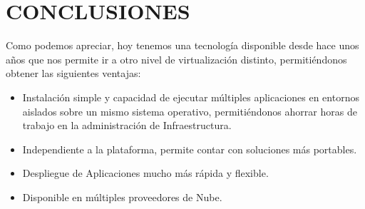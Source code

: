\section{CONCLUSIONES}
Como podemos apreciar, hoy tenemos una tecnología disponible desde hace unos años que nos permite ir a otro nivel de virtualización distinto, permitiéndonos obtener las siguientes ventajas:
\begin{itemize}
\item Instalación simple y capacidad de ejecutar múltiples aplicaciones en entornos aislados sobre un mismo sistema operativo,  permitiéndonos ahorrar horas de trabajo en la administración de Infraestructura.
\item Independiente a la plataforma, permite contar con soluciones más portables.
\item Despliegue de Aplicaciones mucho más rápida y flexible.
\item Disponible en múltiples proveedores de Nube.
	
\end{itemize}

\newpage
